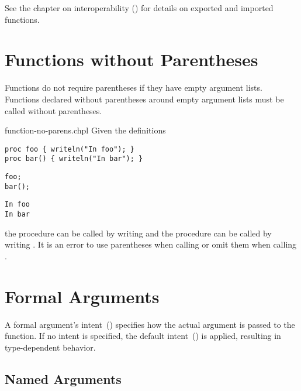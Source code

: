 See the chapter on interoperability ()
for details on exported and imported functions.

\section{Functions without Parentheses}
\label{Functions_without_Parentheses}

Functions do not require parentheses if they have empty argument
lists.  Functions declared without parentheses around empty argument
lists must be called without parentheses.

\begin{chapelexample}{function-no-parens.chpl}
Given the definitions
\begin{chapel}
\begin{verbatim}
proc foo { writeln("In foo"); }
proc bar() { writeln("In bar"); }
\end{verbatim}
\end{chapel}
\begin{chapelpost}
\begin{verbatim}
foo;
bar();
\end{verbatim}
\end{chapelpost}
\begin{chapeloutput}
\begin{verbatim}
In foo
In bar
\end{verbatim}
\end{chapeloutput}
the procedure  can be called by writing  and the
procedure  can be called by writing .  It is an
error to use parentheses when calling  or omit them
when calling .
\end{chapelexample}


\section{Formal Arguments}
\label{Formal_Arguments}

A formal argument's intent~() specifies how the
actual argument is passed to the function.  If no intent is specified,
the default intent~() is applied, resulting in
type-dependent behavior.

\subsection{Named Arguments}
\label{Named_Arguments}

